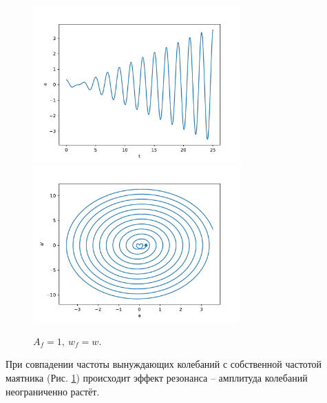             \begin{figure}[H]
                \centering
                \includegraphics[width=8cm]{pictures/4resonance3.pdf}
                \includegraphics[width=8cm]{pictures/4resonance3p.pdf}
                \caption{$A_f = 1, ~ w_f = w$.}\label{w1w}
            \end{figure}
            При совпадении частоты вынуждающих колебаний с собственной частотой маятника (Рис. \ref{w1w}) происходит эффект резонанса -- амплитуда колебаний неограниченно растёт.

